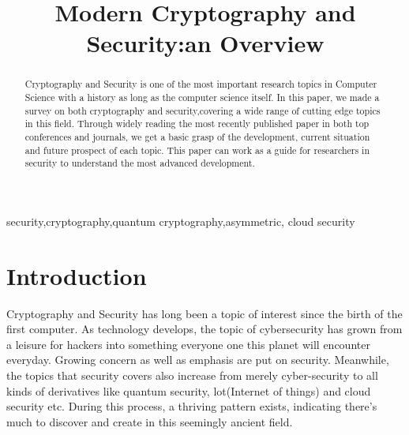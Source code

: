 \documentclass[conference]{IEEEtran}
\begin{document}
\title{Modern Cryptography and Security:an Overview}

\author{
\and
{}
\and
{}
\and
{}
\and
{}
\and
{}
\and
{}
}
\maketitle

\begin{abstract}
Cryptography and Security is one of the most important research topics in Computer Science with a history as long as the computer science itself. In this paper, we made a survey on both cryptography and security,covering a wide range of cutting edge topics in this field. Through widely reading the most recently published paper in both top conferences and journals, we get a basic grasp of the development, current situation and future prospect of each topic. This paper can work as a guide for researchers in security to understand the most advanced development. 
\end{abstract}

\begin{IEEEkeywords}
security,cryptography,quantum cryptography,asymmetric, cloud security

\end{IEEEkeywords}
\section{Introduction}
Cryptography and Security has long been a topic of interest since the birth of the first computer. As technology develops, the topic of cybersecurity has grown from a leisure for hackers into something everyone one this planet will encounter everyday. Growing concern as well as emphasis are put on security. Meanwhile, the topics that security covers also increase from merely cyber-security to all kinds of derivatives like quantum security, lot(Internet of things) and cloud security etc. During this process, a thriving pattern exists, indicating there's much to discover and create in this seemingly ancient field. 
\end{document}
